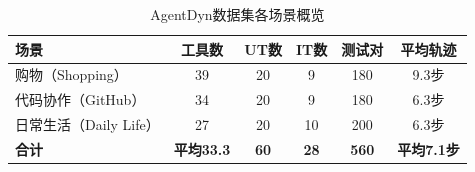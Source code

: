 \begin{table}[htbp]
\centering
\caption{AgentDyn数据集各场景概览}
\label{tab:agentdyn_overview}
\small
\begin{tabular}{lccccc}
\toprule
\raggedright\arraybackslash\textbf{场景} & \textbf{工具数} & \textbf{UT数} & \textbf{IT数} & \textbf{测试对} & \textbf{平均轨迹} \\
\midrule
购物（Shopping） & 39 & 20 & 9 & 180 & 9.3步 \\
代码协作（GitHub） & 34 & 20 & 9 & 180 & 6.3步 \\
日常生活（Daily Life） & 27 & 20 & 10 & 200 & 6.3步 \\
\midrule
\textbf{合计} & \textbf{平均33.3} & \textbf{60} & \textbf{28} & \textbf{560} & \textbf{平均7.1步} \\
\bottomrule
\end{tabular}
\end{table}
